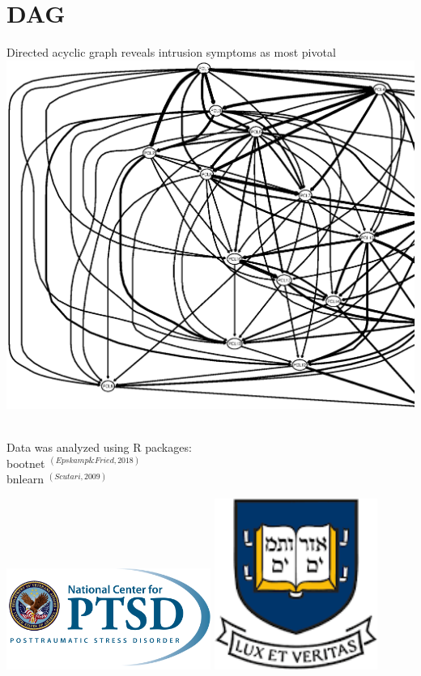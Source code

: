 \documentclass[]{betterposter}
\begin{document}
{\section{DAG}
\begin{center}
Directed acyclic graph reveals intrusion symptoms as most pivotal
    \includegraphics[width=\textwidth]{img/pcl_DAG.eps}
\end{center}

\\
Data was analyzed using R packages: \\
bootnet $^{(Epskamp \& Fried, 2018)}$ \\
bnlearn $^{(Scutari, 2009)}$

\vfill

\begin{flushright}

\includegraphics[width=0.5\textwidth]{img/NCPTSD_Logo.png}
\hfill
\includegraphics[width=0.4\textwidth]{img/Yale.png}
\end{flushright}
}
\end{document}
